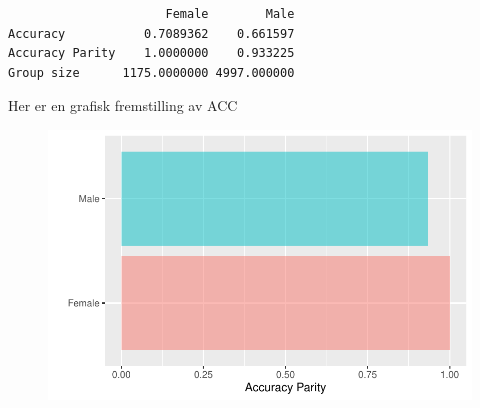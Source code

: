 \documentclass[
  letterpaper,
  DIV=11,
  numbers=noendperiod]{scrreprt}
\newenvironment{Shaded}{\begin{snugshade}}{\end{snugshade}}
\newcommand{\AttributeTok}[1]{\textcolor[rgb]{0.40,0.45,0.13}{#1}}
\newcommand{\FunctionTok}[1]{\textcolor[rgb]{0.28,0.35,0.67}{#1}}
\newcommand{\NormalTok}[1]{\textcolor[rgb]{0.00,0.23,0.31}{#1}}
\newcommand{\OtherTok}[1]{\textcolor[rgb]{0.00,0.23,0.31}{#1}}
\newcommand{\SpecialCharTok}[1]{\textcolor[rgb]{0.37,0.37,0.37}{#1}}
\newcommand{\StringTok}[1]{\textcolor[rgb]{0.13,0.47,0.30}{#1}}
\theoremstyle{definition}
\theoremstyle{remark}
\begin{document}
\begin{Shaded}
\end{Shaded}

\begin{verbatim}
                      Female        Male
Accuracy           0.7089362    0.661597
Accuracy Parity    1.0000000    0.933225
Group size      1175.0000000 4997.000000
\end{verbatim}

Her er en grafisk fremstilling av ACC

\begin{Shaded}
\end{Shaded}

\begin{figure}[H]

{\centering \includegraphics{./fairness_files/figure-pdf/unnamed-chunk-11-1.pdf}

}

\end{figure}
\end{document}
